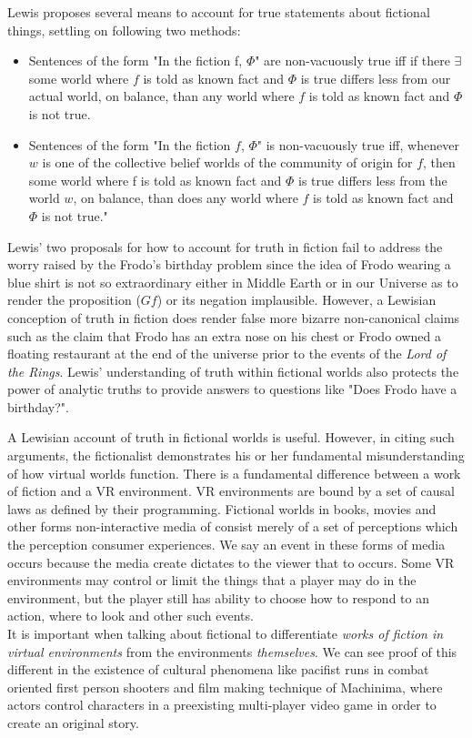  Lewis proposes several means to account for true statements about fictional things, settling on following two methods: 
 \begin{itemize}
 	\item Sentences of the form "In the fiction f, $\Phi$" are non-vacuously true iff if there $\exists$ some
 	world where $f$ is told as known fact and $\Phi$ is true differs less from our actual world, on
 	balance, than any world where $f$ is told as known fact and $\Phi$ is not true. \cite{Lewis1978-LEWTIF}
 	\item Sentences of the form "In the fiction $f$, $\Phi$" is non-vacuously true iff,
 	whenever $w$ is one of the collective belief worlds of the community of origin for $f$, then
 	some world where f is told as known fact and $\Phi$ is true differs less from the world $w$, on
 	balance, than does any world where $f$ is told as known fact and $\Phi$ is not true." \cite{Lewis1978-LEWTIF} \newline
 \end{itemize}
 
 Lewis' two proposals for how to account for truth in fiction fail to address the worry raised by the Frodo's birthday problem since the idea of Frodo wearing a blue shirt is not so extraordinary either in Middle Earth or in our Universe as to render the proposition ($Gf$) or its negation implausible. However, a Lewisian conception of truth in fiction does render false more bizarre non-canonical claims such as the claim that Frodo has an extra nose on his chest or Frodo owned a floating restaurant at the end of the universe prior to the events of the \textit{Lord of the Rings}. Lewis' understanding of truth within fictional worlds also protects the power of analytic truths to provide answers to questions like "Does Frodo have a birthday?". \newline
 
 A Lewisian account of truth in fictional worlds is useful. However, in citing such arguments, the fictionalist demonstrates his or her fundamental misunderstanding of how virtual worlds function. There is a fundamental difference between a work of fiction and a VR environment. VR environments are bound by a set of causal laws as defined by their programming. Fictional worlds in books, movies and other forms non-interactive media of consist merely of a set of perceptions which the perception consumer experiences. We say an event in these forms of media occurs because the media create dictates to the viewer that to occurs. Some VR environments may control or limit the things that a player may do in the environment, but the player still has ability to choose how to respond to an action, where to look and other such events. \\ It is important when talking about fictional to differentiate \textit{works of fiction in virtual environments} from the environments  \textit{themselves}. We can see proof of this different in the existence of cultural phenomena like pacifist runs in combat oriented first person shooters and film making technique of Machinima, where actors control characters in a preexisting multi-player video game in order to create an original story.  
 
